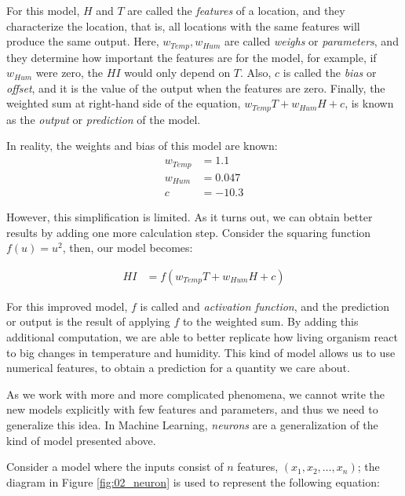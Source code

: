 For this model, $H$ and $T$ are called the \emph{features} of a location, and they characterize the location, that is, all locations with the same features will produce the same output. Here, $w_{Temp}, w_{Hum}$ are called \emph{weighs} or \emph{parameters}, and they determine how important the features are for the model, for example, if $w_{Hum}$ were zero, the $HI$ would only depend on $T$. Also, $c$ is called the \emph{bias} or \emph{offset}, and it is the value of the output when the features are zero.
Finally, the weighted sum at right-hand side of the equation, $w_{Temp} T + w_{Hum} H + c$, is known as the \emph{output} or \emph{prediction} of the model.

In reality, the weights and bias of this model are known:
\begin{align*}
    w_{Temp} & = 1.1\\
    w_{Hum} &= 0.047 \\
    c &= -10.3
\end{align*}

However, this simplification is limited. As it turns out, we can obtain better results by adding one more calculation step. Consider the squaring function $f(u) = u^2$, then, our model becomes:


\begin{align*}
    HI &= f(w_{Temp} T + w_{Hum} H + c)
\end{align*}

For this improved model, $f$ is called and \emph{activation function}, and the prediction or output is the result of applying $f$ to the weighted sum. By adding this additional computation, we are able to better replicate how living organism react to big changes in temperature and humidity. This kind of model allows us to use numerical features, to obtain a prediction for a quantity we care about.


\label{02_nn_neurons}

As we work with more and more complicated phenomena, we cannot write the new models explicitly with few features and parameters, and thus we need to generalize this idea. 
In Machine Learning, \emph{neurons} are a generalization of the kind of model presented above. 



Consider a model where the  inputs consist of $n$ features, $(x_1, x_2,\ldots,x_n)$; the diagram in Figure \ref{fig:02_neuron} is used to represent the following equation:

